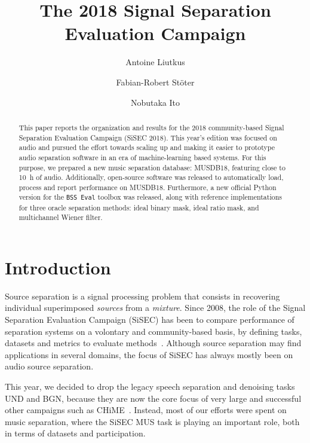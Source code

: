 \documentclass{llncs}
\begin{document}
\title{The 2018 Signal Separation Evaluation Campaign}
\author{
Antoine Liutkus \and
Fabian-Robert St\"{o}ter \and
Nobutaka Ito
}


\maketitle
%
\vspace{-3mm}
\begin{abstract}
This paper reports the organization and results for the 2018 community-based Signal Separation Evaluation Campaign (SiSEC 2018). This year's edition was focused on audio and pursued the effort towards scaling up and making it easier to prototype audio separation software in an era of machine-learning based systems. For this purpose, we prepared a new music separation database: MUSDB18, featuring close to 10~h of audio. Additionally, open-source software was released to automatically load, process and report performance on MUSDB18. Furthermore, a new official Python version for the \texttt{BSS~Eval} toolbox was released, along with reference implementations for three oracle separation methods: ideal binary mask, ideal ratio mask, and multichannel Wiener filter.
\end{abstract}

\setcounter{footnote}{0}
\section{Introduction}
\vspace{-2mm}
Source separation is a signal processing problem that consists in recovering individual superimposed \textit{sources} from a \textit{mixture}.  Since 2008, the role of the Signal Separation Evaluation Campaign (SiSEC) has been to compare performance of separation systems on a volontary and community-based basis, by defining tasks, datasets and metrics to evaluate methods~\cite{sassec2007,sisec2008,sisec0710,sisec2011,sisec2013,sisec2015,sisec2016}. Although source separation may find applications in several domains, the focus of SiSEC has always mostly been on audio source separation.

This year, we decided to drop the legacy speech separation and denoising tasks UND and BGN, because they are now the core focus of very large and successful other campaigns such as CHiME~\cite{chime,chime2,chime3}. Instead, most of our efforts were spent on music separation, where the SiSEC MUS task is playing an important role, both in terms of datasets and participation. %
\end{document}
